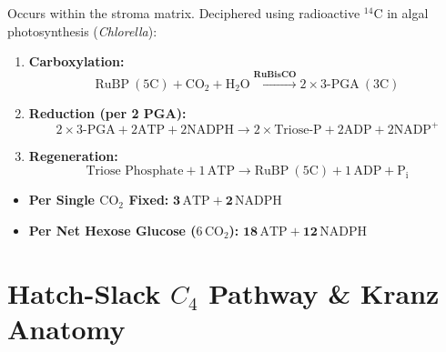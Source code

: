 \documentclass[10pt,twoside,openright]{book}
\begin{document}
\begin{formulabox}
Occurs within the stroma matrix. Deciphered using radioactive $^{14}\mathrm{C}$ in algal photosynthesis (\textit{Chlorella}):
\begin{enumerate}[leftmargin=*]
  \item \textbf{Carboxylation:}
  \[
    \mathrm{RuBP}\ (5\mathrm{C}) + \mathrm{CO_2} + \mathrm{H_2O} \xrightarrow{\mathbf{RuBisCO}} 2 \times 3\text{-PGA}\ (3\mathrm{C})
  \]
  \item \textbf{Reduction (per 2 PGA):}
  \[
    2 \times 3\text{-PGA} + 2\mathrm{ATP} + 2\mathrm{NADPH} \longrightarrow 2\times\text{Triose-P} + 2\mathrm{ADP} + 2\mathrm{NADP}^+
  \]
  \item \textbf{Regeneration:}
  \[
    \text{Triose Phosphate} + 1\,\mathrm{ATP} \longrightarrow \mathrm{RuBP}\ (5\mathrm{C}) + 1\,\mathrm{ADP} + \mathrm{P_i}
  \]
\end{enumerate}
\begin{itemize}[leftmargin=*]
  \item \textbf{Per Single $\mathrm{CO_2}$ Fixed:} $\mathbf{3\,\mathrm{ATP} + 2\,\mathrm{NADPH}}$
  \item \textbf{Per Net Hexose Glucose ($6\,\mathrm{CO_2}$):} $\mathbf{18\,\mathrm{ATP} + 12\,\mathrm{NADPH}}$
\end{itemize}
\end{formulabox}

\section{Hatch-Slack $C_4$ Pathway \& Kranz Anatomy}
\end{document}
